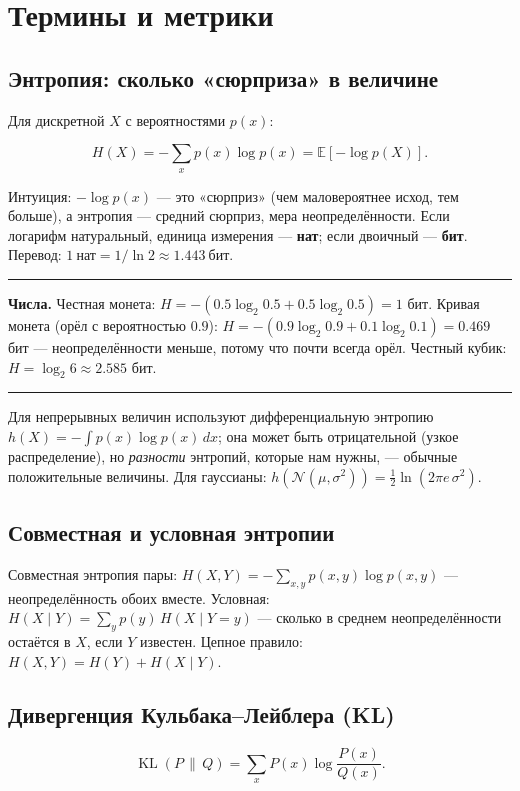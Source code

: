 \documentclass[11pt]{article}
\newcommand{\nat}{\text{нат}}
\newcommand{\bit}{\text{бит}}
\newcommand{\KL}{\operatorname{KL}}
\newcommand{\EE}{\mathbb{E}}
\newenvironment{exbox}{%
  \par\medskip\noindent
  \begin{minipage}[t]{\linewidth}
  \color{accent}\rule[2pt]{\linewidth}{0.6pt}\color{black}
  \vspace{0.4em}\noindent\small
}{%
  \vspace{0.4em}
  \color{accent}\rule[2pt]{\linewidth}{0.6pt}\color{black}
  \end{minipage}\par\medskip
}
\begin{document}
\section{Термины и метрики}

\subsection{Энтропия: сколько «сюрприза» в величине}

Для дискретной $X$ с вероятностями $p(x)$:

\[
H(X)=-\sum_x p(x)\log p(x)=\EE[-\log p(X)].
\]

Интуиция: $-\log p(x)$ — это «сюрприз» (чем маловероятнее исход, тем больше), а энтропия — средний сюрприз, мера неопределённости. Если логарифм натуральный, единица измерения — \textbf{нат}; если двоичный — \textbf{бит}. Перевод: $1\ \nat = 1/\ln 2 \approx 1.443\ \bit$.

\begin{exbox}
\textbf{Числа.} Честная монета: $H=-(0.5\log_2 0.5 + 0.5\log_2 0.5)=1$ бит. Кривая монета (орёл с вероятностью $0.9$): $H=-(0.9\log_2 0.9+0.1\log_2 0.1)=0.469$ бит — неопределённости меньше, потому что почти всегда орёл. Честный кубик: $H=\log_2 6\approx 2.585$ бит.
\end{exbox}

Для непрерывных величин используют дифференциальную энтропию $h(X)=-\int p(x)\log p(x)\,dx$; она может быть отрицательной (узкое распределение), но \emph{разности} энтропий, которые нам нужны, — обычные положительные величины. Для гауссианы: $h(\mathcal{N}(\mu,\sigma^2))=\tfrac12\ln(2\pi e\,\sigma^2)$.

\subsection{Совместная и условная энтропии}

Совместная энтропия пары: $H(X,Y)=-\sum_{x,y}p(x,y)\log p(x,y)$ — неопределённость обоих вместе. Условная: $H(X\mid Y)=\sum_y p(y)\,H(X\mid Y=y)$ — сколько в среднем неопределённости остаётся в $X$, если $Y$ известен. Цепное правило: $H(X,Y)=H(Y)+H(X\mid Y)$.

\subsection{Дивергенция Кульбака–Лейблера (KL)}

\[
\KL(P\,\|\,Q)=\sum_x P(x)\log\frac{P(x)}{Q(x)}.
\]
\end{document}
